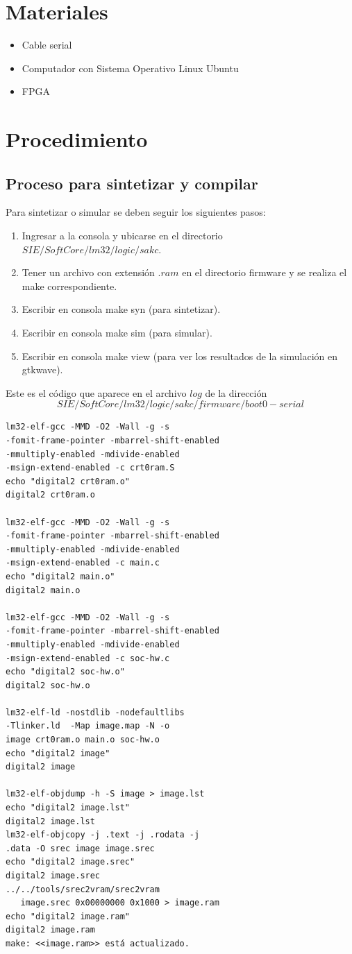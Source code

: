 \documentclass[twocolumn]{IEEEtran}
\begin{document}
\section{Materiales}
\begin{itemize}
 \item Cable serial
 \item Computador con Sistema Operativo Linux Ubuntu
 \item FPGA
\end{itemize}

\section{Procedimiento}
\subsection{Proceso para sintetizar y compilar}
\noindent
Para sintetizar o simular se deben seguir los siguientes pasos:
\begin{enumerate}
 \item Ingresar a la consola y ubicarse en el directorio $SIE/SoftCore/lm32/logic/sakc$.
 \item Tener un archivo con extensión $.ram$ en el directorio firmware y se realiza el make correspondiente.
 \item Escribir en consola make syn (para sintetizar).
 \item Escribir en consola make sim (para simular).
 \item Escribir en consola make view (para ver los resultados de la simulación en gtkwave).
\end{enumerate}
\noindent
Este es el código que aparece en el archivo $log$ de la dirección $$SIE/SoftCore/lm32/logic/sakc/firmware/boot0-serial$$
\begin{verbatim}
lm32-elf-gcc -MMD -O2 -Wall -g -s
-fomit-frame-pointer -mbarrel-shift-enabled
-mmultiply-enabled -mdivide-enabled
-msign-extend-enabled -c crt0ram.S
echo "digital2 crt0ram.o"
digital2 crt0ram.o

lm32-elf-gcc -MMD -O2 -Wall -g -s
-fomit-frame-pointer -mbarrel-shift-enabled
-mmultiply-enabled -mdivide-enabled
-msign-extend-enabled -c main.c
echo "digital2 main.o"
digital2 main.o

lm32-elf-gcc -MMD -O2 -Wall -g -s
-fomit-frame-pointer -mbarrel-shift-enabled
-mmultiply-enabled -mdivide-enabled
-msign-extend-enabled -c soc-hw.c
echo "digital2 soc-hw.o" 
digital2 soc-hw.o

lm32-elf-ld -nostdlib -nodefaultlibs
-Tlinker.ld  -Map image.map -N -o 
image crt0ram.o main.o soc-hw.o
echo "digital2 image" 
digital2 image

lm32-elf-objdump -h -S image > image.lst
echo "digital2 image.lst" 
digital2 image.lst
lm32-elf-objcopy -j .text -j .rodata -j
.data -O srec image image.srec
echo "digital2 image.srec" 
digital2 image.srec
../../tools/srec2vram/srec2vram
   image.srec 0x00000000 0x1000 > image.ram
echo "digital2 image.ram" 
digital2 image.ram
make: <<image.ram>> está actualizado.
\end{verbatim}
\end{document}
